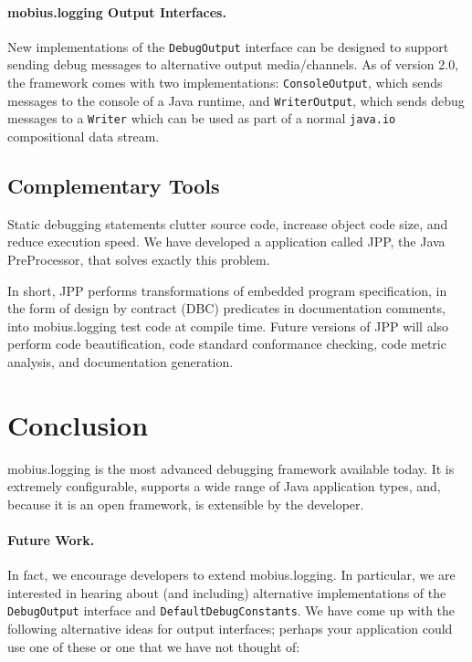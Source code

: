\documentclass{article}
\begin{document}
\paragraph{mobius.logging Output Interfaces.}
New implementations of the \texttt{DebugOutput} interface can be
designed to support sending debug messages to alternative output
media/channels.  As of version 2.0, the framework comes with two
implementations: \texttt{ConsoleOutput}, which sends messages to the
console of a Java runtime, and \texttt{WriterOutput}, which sends
debug messages to a \texttt{Writer} which can be used as part of a
normal \texttt{java.io} compositional data stream.

\subsection{Complementary Tools}

Static debugging statements clutter source code, increase object code
size, and reduce execution speed.  We have developed a application
called JPP, the Java PreProcessor, that solves exactly this
problem.

In short, JPP performs transformations of embedded program
specification, in the form of design by contract\cite{Meyer92a} (DBC)
predicates in documentation comments, into mobius.logging test code at compile
time.  Future versions of JPP will also perform code beautification,
code standard conformance checking, code metric analysis, and
documentation generation.

\section{Conclusion}

mobius.logging is the most advanced debugging framework available today.  It
is extremely configurable, supports a wide range of Java application
types, and, because it is an open framework, is extensible by the
developer.

\paragraph{Future Work.}

In fact, we encourage developers to extend mobius.logging.  In particular, we
are interested in hearing about (and including) alternative
implementations of the \texttt{DebugOutput} interface and
\texttt{DefaultDebugConstants}.  We have come up with the following
alternative ideas for output interfaces; perhaps your application
could use one of these or one that we have not thought of:
\end{document}
